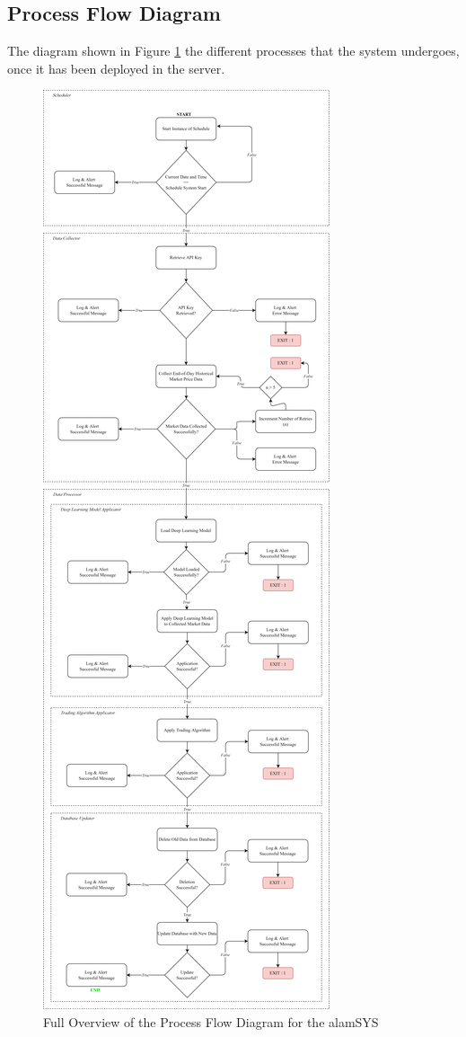 \subsection{Process Flow Diagram}
\label{subsec:process_flow}
The diagram shown in Figure \ref{fig:process_flowchart} the different processes 
that the system undergoes, once it has been deployed in the server.

\begin{figure}[ht]
    \centering
    \includegraphics[height=0.90\textheight]{./assets/Chapter_3/PFC/ProcessFlowchart.png}
    \caption{Full Overview of the Process Flow Diagram for the alamSYS}
    \label{fig:process_flowchart}
\end{figure}
\FloatBarrier

